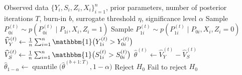 \documentclass[12pt]{article}
\newcommand{\one}{\mathbbm{1}}
\begin{document}
\begin{algorithm}[htbp!]
\caption{Bayesian Imputation-Based Approach.}
\label{alg:bayesian_approach}
\begin{algorithmic}[1]
\Require Observed data \(\{Y_i, S_i, Z_{i}, X_{i}\}_{i=1}^n\), prior parameters, number of posterior iterations \(T\), burn-in \(b\), surrogate threshold \(\eta\), significance level \(\alpha\)
            \State Sample \(P^{(t)}_{0i} \sim p \left( P^{(t)}_{0i} \mid P_{1i}, X_{i}, Z_{i}=1\right)\)
        \Else
            \State Sample \(P^{(t)}_{1i} \sim p \left( P^{(t)}_{1i} \mid P_{0i}, X_{i}, Z_{i}=0\right)\)
        \EndIf
    \EndFor
    \State \(\widehat{V}_Y^{(t)} \gets \frac{1}{n} \sum_{i=1}^{n} \one \big(Y_{1i}^{(t)} > Y_{0i}^{(t)}\big)\)
    \State \(\widehat{V}_{S}^{(t)} \gets \frac{1}{n} \sum_{i=1}^{n} \one \big(S_{1i}^{(t)} > S_{0i}^{(t)}\big)\)
    \State \(\widehat{\theta}^{(t)} \gets \widehat{V}_Y^{(t)} - \widehat{V}_{S}^{(t)}\)
\EndFor
\State \(\widehat{\theta}_{1-\alpha} \gets \operatorname{quantile}\!\Big(\widehat{\theta}^{(b+1:T)}, 1-\alpha\Big)\)
    \State Reject \(H_0\)
\Else
    \State Fail to reject \(H_0\)
\EndIf
\end{algorithmic}
\end{algorithm}
\end{document}
